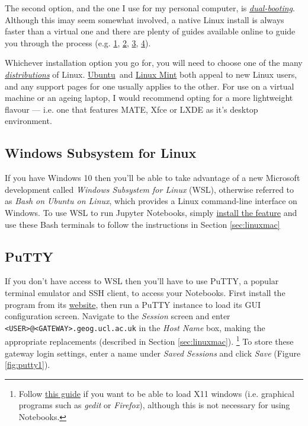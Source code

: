 \documentclass[a4paper]{article}
\begin{document}
The second option, and the one I use for my personal computer, is \emph{\href{https://www.howtogeek.com/187789/dual-booting-explained-how-you-can-have-multiple-operating-systems-on-your-computer/}{dual-booting}}.
Although this imay seem somewhat involved, a native Linux install is always faster than a virtual one and there are plenty of guides available online to guide you through the process (e.g. \href{https://itsfoss.com/guide-install-linux-mint-16-dual-boot-windows/}{1}, \href{https://www.lifewire.com/ultimate-windows-7-ubuntu-linux-dual-boot-guide-2200.53}{2}, \href{https://www.howtogeek.com/214571/how-to-dual-boot-linux-on-your-pc/}{3}, \href{http://www.pcworld.com/article/2955460/operating-systems/dual-booting-linux-with-windows-what-you-need-to-know.html}{4}). 

Whichever installation option you go for, you will need to choose one of the many \emph{\href{http://distrowatch.com/dwres.php?resource=major}{distributions}} of Linux. \href{https://www.ubuntu.com/download}{Ubuntu}~and \href{https://linuxmint.com/}{Linux Mint} both appeal to new Linux users, and any support pages for one usually applies to the other.
For use on a virtual machine or an ageing laptop, I would recommend opting for a more lightweight flavour --- i.e. one that features MATE, Xfce or LXDE as it's desktop environment.

\subsection{Windows Subsystem for Linux}
\label{sec:wsl}
If you have Windows 10 then you'll be able to take advantage of a new Microsoft development called \emph{Windows Subsystem for Linux} (WSL), otherwise referred to as \emph{Bash on Ubuntu on Linux}, which provides a Linux command-line interface on Windows.
To use WSL to run Jupyter Notebooks, simply \href{https://msdn.microsoft.com/en-gb/commandline/wsl/install_guide}{install the feature} and use these Bash terminals to follow the instructions in Section \ref{sec:linuxmac}

\subsection{PuTTY}
\label{sec:putty}

If you don't have access to WSL then you'll have to use PuTTY, a popular terminal emulator and SSH client, to access your Notebooks. 
First install the program from its \href{http://www.chiark.greenend.org.uk/~sgtatham/putty/latest.html}{website}, then run a PuTTY instance to load its GUI configuration screen. 
Navigate to the \emph{Session} screen and enter \texttt{\textless{}USER\textgreater{}@\textless{}GATEWAY\textgreater{}.geog.ucl.ac.uk} in the \emph{Host Name} box, making the appropriate replacements (described in Section \ref{sec:linuxmac}).
\footnote{Follow \href{http://www.geo.mtu.edu/geoschem/docs/putty_install.html}{this guide} if you want to be able to load X11 windows (i.e. graphical programs such as \emph{gedit} or \emph{Firefox}), although this is not necessary for using Notebooks.}
To store these gateway login settings, enter a name under \emph{Saved Sessions} and click \emph{Save} (Figure \ref{fig:putty1}).
\end{document}
